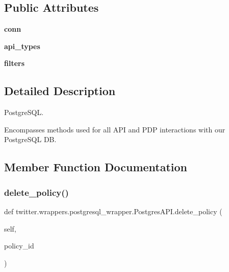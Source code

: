 \subsection*{Public Attributes}
\begin{DoxyCompactItemize}
\item 
\mbox{\label{classtwitter_1_1wrappers_1_1postgresql__wrapper_1_1PostgresAPI_afadde44f92f712763ef7d0aeaea2ef0f}} 
{\bfseries conn}
\item 
\mbox{\label{classtwitter_1_1wrappers_1_1postgresql__wrapper_1_1PostgresAPI_aed05e237c349e83bbcb76eccaf4f56df}} 
{\bfseries api\+\_\+types}
\item 
\mbox{\label{classtwitter_1_1wrappers_1_1postgresql__wrapper_1_1PostgresAPI_ad5c56fa3b0421230409f1a4268fcfa26}} 
{\bfseries filters}
\end{DoxyCompactItemize}


\subsection{Detailed Description}
Postgre\+S\+QL. 

Encompasses methods used for all A\+PI and P\+DP interactions with our Postgre\+S\+QL DB. 

\subsection{Member Function Documentation}
\mbox{\label{classtwitter_1_1wrappers_1_1postgresql__wrapper_1_1PostgresAPI_a93b51196b75f21a7061a027a0b530bf0}} 
\subsubsection{\texorpdfstring{delete\+\_\+policy()}{delete\_policy()}}
{\footnotesize\ttfamily def twitter.\+wrappers.\+postgresql\+\_\+wrapper.\+Postgres\+A\+P\+I.\+delete\+\_\+policy (\begin{DoxyParamCaption}\item[{}]{self,  }\item[{}]{policy\+\_\+id }\end{DoxyParamCaption})}



